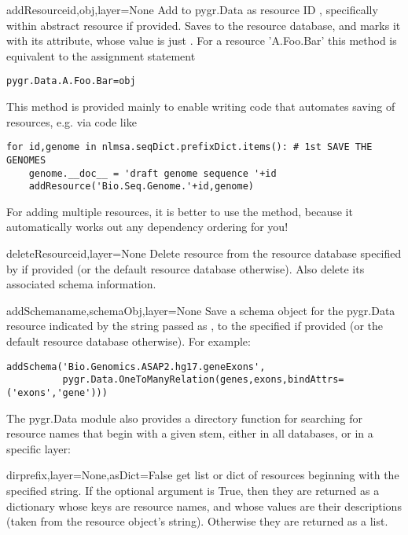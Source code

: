 \documentclass{howto}
\begin{document}
\begin{funcdesc}{addResource}{id,obj,layer=None}
  Add  to pygr.Data as resource ID , specifically within
  abstract resource  if provided.  Saves  to 
  the resource database, and marks it with its 
  attribute, whose value is just .  For a resource  'A.Foo.Bar'
  this method is equivalent to the assignment statement
\begin{verbatim}
pygr.Data.A.Foo.Bar=obj
\end{verbatim}
  This method is provided mainly to enable writing code that automates
  saving of resources, e.g. via code like
\begin{verbatim}
for id,genome in nlmsa.seqDict.prefixDict.items(): # 1st SAVE THE GENOMES
    genome.__doc__ = 'draft genome sequence '+id
    addResource('Bio.Seq.Genome.'+id,genome)
\end{verbatim}
  For adding multiple resources,
  it is better to use the  method, because it 
  automatically works out any dependency ordering for you!
\end{funcdesc}

\begin{funcdesc}{deleteResource}{id,layer=None}
  Delete resource  from the resource database specified by
   if provided (or the default resource database otherwise).
  Also delete its associated schema information.
\end{funcdesc}

\begin{funcdesc}{addSchema}{name,schemaObj,layer=None}
  Save a schema object for the pygr.Data resource indicated by the
  string passed as , to the specified  if provided
  (or the default resource database otherwise).  For example:
\begin{verbatim}
addSchema('Bio.Genomics.ASAP2.hg17.geneExons',
          pygr.Data.OneToManyRelation(genes,exons,bindAttrs=('exons','gene')))
\end{verbatim}
\end{funcdesc}


The pygr.Data module also provides a directory function for searching
for resource names that begin with a given stem, either in all
databases, or in a specific layer:
\begin{funcdesc}{dir}{prefix,layer=None,asDict=False}
  get list or dict of resources beginning with the specified string.
  If the optional  argument is True, then they are returned
  as a dictionary whose keys are resource names, and whose values are their
  descriptions (taken from the resource object's  string).
  Otherwise they are returned as a list.
\end{funcdesc}
\end{document}
